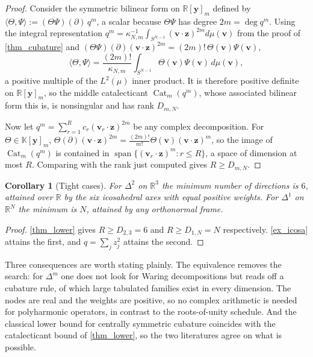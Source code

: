 \documentclass[final]{siamltex}
\DeclareMathOperator{\spanop}{span}
\DeclareMathOperator{\Cat}{Cat}
\newtheorem{corollary}[corollary]{Corollary}
\newcommand{\R}{\mathbb{R}}
\newcommand{\K}{\mathbb{K}}
\newcommand{\by}{\bm{y}}
\newcommand{\bz}{\bm{z}}
\newcommand{\bv}{\bm{v}}
\begin{document}
\begin{proof}
  Consider the symmetric bilinear form on $\R[\by]_{m}$ defined by
  $\langle \Theta,\Psi\rangle := (\Theta\Psi)(\partial)\,q^{m}$, a scalar because
  $\Theta\Psi$ has degree $2m = \deg q^{m}$.  Using the integral representation
  $q^{m} = \kappa_{N,m}^{-1}\int_{S^{N-1}}(\bv\cdot\bz)^{2m}d\mu(\bv)$ from the
  proof of \cref{thm_cubature} and
  $(\Theta\Psi)(\partial)(\bv\cdot\bz)^{2m} = (2m)!\,\Theta(\bv)\Psi(\bv)$,
  \begin{equation*}
    \langle\Theta,\Psi\rangle
    = \frac{(2m)!}{\kappa_{N,m}}\int_{S^{N-1}}\Theta(\bv)\Psi(\bv)\,d\mu(\bv),
  \end{equation*}
  a positive multiple of the $L^{2}(\mu)$ inner product.  It is therefore
  positive definite on $\R[\by]_{m}$, so the middle catalecticant
  $\Cat_{m}(q^{m})$, whose associated bilinear form this is, is nonsingular and
  has rank $D_{m,N}$.

  Now let $q^{m} = \sum_{r=1}^{R}c_{r}(\bv_{r}\cdot\bz)^{2m}$ be any complex
  decomposition.  For $\Theta \in \K[\by]_{m}$,
  $\Theta(\partial)(\bv\cdot\bz)^{2m} = \frac{(2m)!}{m!}\Theta(\bv)(\bv\cdot\bz)^{m}$,
  so the image of $\Cat_{m}(q^{m})$ is contained in
  $\spanop\{(\bv_{r}\cdot\bz)^{m} : r \le R\}$, a space of dimension at most
  $R$.  Comparing with the rank just computed gives $R \ge D_{m,N}$.
\end{proof}

\begin{corollary}[Tight cases]\label{cor_tight}
  For $\Delta^{2}$ on $\R^{3}$ the minimum number of directions is $6$, attained
  over $\R$ by the six icosahedral axes with equal positive weights.  For
  $\Delta^{1}$ on $\R^{N}$ the minimum is $N$, attained by any orthonormal frame.
\end{corollary}

\begin{proof}
  \cref{thm_lower} gives $R \ge D_{2,3} = 6$ and $R \ge D_{1,N} = N$
  respectively.  \cref{ex_icosa} attains the first, and
  $q = \sum_{j}z_{j}^{2}$ attains the second.
\end{proof}

Three consequences are worth stating plainly.  The equivalence removes the
search: for $\Delta^{m}$ one does not look for Waring decompositions but reads
off a cubature rule, of which large tabulated families exist in every dimension.
The nodes are real and the weights are positive, so no complex arithmetic is
needed for polyharmonic operators, in contrast to the roots-of-unity schedule.
And the classical lower bound for centrally symmetric cubature coincides with
the catalecticant bound of \cref{thm_lower}, so the two literatures agree on what
is possible.
\end{document}

